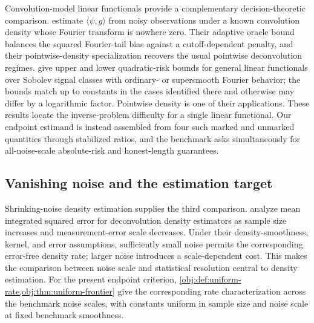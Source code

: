 Convolution-model linear functionals provide a complementary decision-theoretic comparison. \citet[Theorem~3.1 and Section~4.1]{Butucea2009} estimate \(\langle\psi,g\rangle\) from noisy observations under a known convolution density whose Fourier transform is nowhere zero. Their adaptive oracle bound balances the squared Fourier-tail bias against a cutoff-dependent penalty, and their pointwise-density specialization recovers the usual pointwise deconvolution regimes. \citet[Theorems~1--2 and Section~2.5]{Pensky2017} give upper and lower quadratic-risk bounds for general linear functionals over Sobolev signal classes with ordinary- or supersmooth Fourier behavior; the bounds match up to constants in the cases identified there and otherwise may differ by a logarithmic factor. Pointwise density is one of their applications. These results locate the inverse-problem difficulty for a single linear functional. Our endpoint estimand is instead assembled from four such marked and unmarked quantities through stabilized ratios, and the benchmark asks simultaneously for all-noise-scale absolute-risk and honest-length guarantees.

\subsection{Vanishing noise and the estimation target}

Shrinking-noise density estimation supplies the third comparison. \citet[Theorems~2.1 and 2.2]{Delaigle2008ShrinkingNoise} analyze mean integrated squared error for deconvolution density estimators as sample size increases and measurement-error scale decreases. Under their density-smoothness, kernel, and error assumptions, sufficiently small noise permits the corresponding error-free density rate; larger noise introduces a scale-dependent cost. This makes the comparison between noise scale and statistical resolution central to density estimation. For the present endpoint criterion, \cref{obj:def:uniform-rate,obj:thm:uniform-frontier} give the corresponding rate characterization across the benchmark noise scales, with constants uniform in sample size and noise scale at fixed benchmark smoothness.

